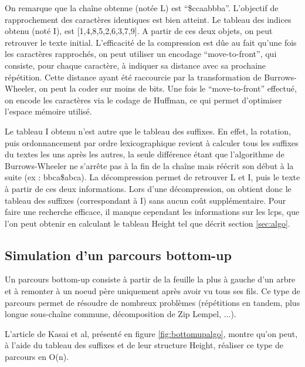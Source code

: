 \documentclass[a4paper,10pt]{article}
\begin{document}
On remarque que la chaîne obtenue (notée L) est
``\$ccaabbba''. L'objectif de rapprochement des caractères identiques
est bien atteint. Le tableau des indices obtenu (noté I), est
[1,4,8,5,2,6,3,7,9]. A partir de ces deux objets, on peut retrouver le
texte initial. L'efficacité de la compression est dûe au fait qu'une
fois les caractères rapprochés, on peut utiliser un encodage
``move-to-front'', qui consiste, pour chaque caractère, à indiquer sa
distance avec sa prochaine répétition. Cette distance ayant été
raccourcie par la transformation de Burrows-Wheeler, on peut la coder
sur moins de bits. Une fois le ``move-to-front'' effectué, on encode
les caractères via le codage de Huffman, ce qui permet d'optimiser
l'espace mémoire utilisé.

Le tableau I obtenu n'est autre que le tableau des suffixes. En effet,
la rotation, puis ordonnancement par ordre lexicographique revient à
calculer tous les suffixes du textes les uns après les autres, la
seule différence étant que l'algorithme de Burrows-Wheeler ne s'arrête
pas à la fin de la chaîne mais réécrit son début à la suite (ex :
bbca\$abca). La décompression permet de retrouver L et I, puis le
texte à partir de ces deux informations. Lors d'une décompression, on
obtient donc le tableau des suffixes (correspondant à I) sans aucun
coût supplémentaire. Pour faire une recherche efficace, il manque
cependant les informations sur les lcps, que l'on peut obtenir en
calculant le tableau Height tel que décrit section \ref{sec:algo}.


\subsection{Simulation d'un parcours bottom-up}
\label{sec:bottomup}

Un parcours bottom-up consiste à partir de la feuille la plus à gauche
d'un arbre et à remonter à un noeud père uniquement après avoir vu
tous ses fils. Ce type de parcours permet de résoudre de nombreux
problèmes (répétitions en tandem, plus longue sous-chaîne commune,
décomposition de Zip Lempel, ...)\cite{Abouelhoda200453}.

L'article de Kasai et al, présenté en figure \ref{fig:bottomupalgo},
montre qu'on peut, à l'aide du tableau des suffixes et de leur
structure Height, réaliser ce type de parcours en O(n).
\end{document}
